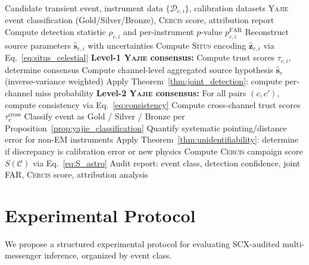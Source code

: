 \documentclass[11pt,a4paper]{article}
\theoremstyle{definition}
\newcommand{\Situs}{\textsc{Situs}}
\newcommand{\Yajie}{\textsc{Yajie}}
\newcommand{\Cercis}{\textsc{Cercis}}
\newcommand{\SCX}{\textsc{SCX}}
\begin{document}
\begin{algorithm}[htbp]
\caption{Multi-Messenger \SCX{} Audit with \Yajie{} Consensus SCXYajie}
\label{alg:multi_messenger_audit}
\begin{algorithmic}[1]
\Require Candidate transient event, instrument data $\{\mathcal{D}_{c,i}\}$, calibration datasets
\Ensure \Yajie{} event classification (Gold/Silver/Bronze), \Cercis{} score, attribution report
        \State Compute detection statistic $\rho_{c,i}$ and per-instrument $p$-value $p_{c,i}^{\mathrm{FAR}}$
        \State Reconstruct source parameters $\hat{\mathbf{s}}_{c,i}$ with uncertainties
        \State Compute \Situs{} encoding $\hat{\mathbf{z}}_{c,i}$ via Eq.~\ref{eq:situs_celestial}
    \EndFor
    \State \textbf{Level-1 \Yajie{} consensus:} Compute trust scores $\tau_{c,i}$, determine consensus
    \State Compute channel-level aggregated source hypothesis $\hat{\mathbf{s}}_c$ (inverse-variance weighted)
    \State Apply Theorem~\ref{thm:joint_detection}: compute per-channel miss probability
\EndFor
\State \textbf{Level-2 \Yajie{} consensus:} For all pairs $(c, c')$, compute consistency via Eq.~\ref{eq:consistency}
\State Compute cross-channel trust scores $\tau_c^{\mathrm{cross}}$
\State Classify event as Gold / Silver / Bronze per Proposition~\ref{prop:yajie_classification}
    \State Quantify systematic pointing/distance error for non-EM instruments
    \State Apply Theorem~\ref{thm:unidentifiability}: determine if discrepancy is calibration error or new physics
\EndIf
\State Compute \Cercis{} campaign score $S(\mathcal{C})$ via Eq.~\ref{eq:S_astro}
\State \Return Audit report: event class, detection confidence, joint FAR, \Cercis{} score, attribution analysis
\end{algorithmic}
\end{algorithm}
\section{Experimental Protocol}
\label{sec:experiment}
We propose a structured experimental protocol for evaluating \SCX{}-audited multi-messenger inference, organized by event class.
\end{document}
